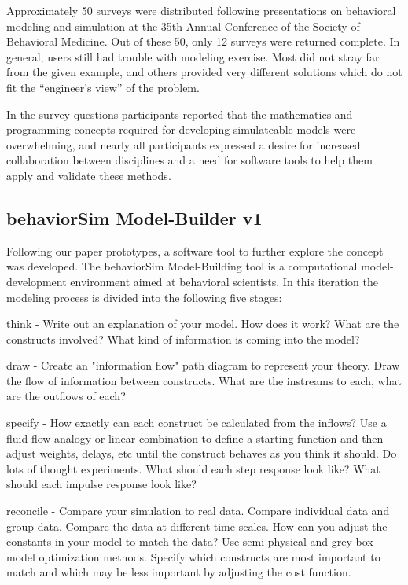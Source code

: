 \documentclass[conference]{IEEEtran}
\begin{document}
Approximately 50 surveys were distributed following presentations on behavioral modeling and simulation at the 35th Annual Conference of the Society of Behavioral Medicine. 
Out of these 50, only 12 surveys were returned complete.
In general, users still had trouble with modeling exercise.
Most did not stray far from the given example, and others provided very different solutions which do not fit the ``engineer's view'' of the problem.

In the survey questions participants reported that the mathematics and programming concepts required for developing simulateable models were overwhelming, and nearly all participants expressed a desire for increased collaboration between disciplines and a need for software tools to help them apply and validate these methods.
  
\subsection{behaviorSim Model-Builder v1}
Following our paper prototypes, a software tool to further explore the concept was developed.
The behaviorSim Model-Building tool is a computational model-development environment aimed at behavioral scientists.
In this iteration the modeling process is divided into the following five stages:

think - 
Write out an explanation of your model. 
How does it work? 
What are the constructs involved? 
What kind of information is coming into the model?

draw - 
Create an "information flow" path diagram to represent your theory. 
Draw the flow of information between constructs. 
What are the instreams to each, what are the outflows of each?

specify - 
How exactly can each construct be calculated from the inflows? 
Use a fluid-flow analogy or linear combination to define a starting function and then adjust weights, delays, etc until the construct behaves as you think it should. 
Do lots of thought experiments. 
What should each step response look like? 
What should each impulse response look like?

reconcile - 
Compare your simulation to real data. 
Compare individual data and group data. 
Compare the data at different time-scales. 
How can you adjust the constants in your model to match the data? 
Use semi-physical and grey-box model optimization methods. 
Specify which constructs are most important to match and which may be less important by adjusting the cost function.
\end{document}
